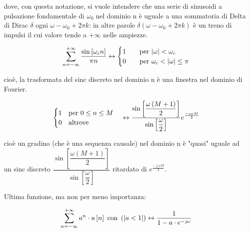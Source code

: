 dove, con questa notazione, si vuole intendere che una serie di sinusoidi a pulsazione fondamentale di $\omega_0$ nel dominio n è uguale a 
una sommatoria di Delta di Dirac $\delta$ ogni $\omega -\omega_0 + 2 \pi k$: in altre parole $\delta \left( \omega - \omega_0 + 2 \pi k\right)$ è un treno di impulsi il cui valore tende a $+ \infty$ nelle ampiezze. \newline 

{
    \Large 
    \begin{equation} \label{eq: trasformata del sinc discreto nel dominio n}
        \sum_{n = - \infty}^{+ \infty}
        \dfrac{\sin \left[ \omega_c n\right]}{\pi n}
        \leftrightarrow 
        \begin{cases}
            \setlength{\jot}{10pt} %
            1 \quad &\text{per } \abs{\omega} < \omega_c 
            \\
            0 \quad &\text{per } \omega_c < \abs{\omega} \leq \pi 
        \end{cases}
    \end{equation}
}



cioè, la trasformata del sinc discreto nel dominio n è una finestra nel dominio di Fourier. \newline 

\newpage 

{
    \Large 
    \begin{equation}
        \setlength{\jot}{10pt} %
        \begin{cases}
            1 \quad \text{per } 0 \leq n \leq M 
            \\
            0 \quad \text{altrove }
        \end{cases} 
        \leftrightarrow
        \dfrac{\sin \left[ \dfrac{\omega \left(M + 1\right)}{2}\right]}{\sin \left[ \dfrac{\omega}{2}\right]}
        e^{\frac{- \jmath \omega M}{2} }
    \end{equation}
}

cioè un gradino (che è una sequenza causale) nel dominio n è "quasi" uguale ad un sinc discreto $\dfrac{\sin \left[ \dfrac{\omega \left(M + 1\right)}{2}\right]}{\sin \left[ \dfrac{\omega}{2}\right]}$ 
ritardato di $e^{\frac{- \jmath \omega M}{2} }$. \newline 

Ultima funzione, ma non per meno importanza: 

{
    \Large 
    \begin{equation}
    \sum_{n = - \infty}^{+\infty}
    a^{n} \cdot u\left[ n\right] \text{ con } \left( \abs{a < 1}\right)
    \leftrightarrow 
    \dfrac{1}{1 - a \cdot e^{- \jmath \omega}}         
    \end{equation}
}


